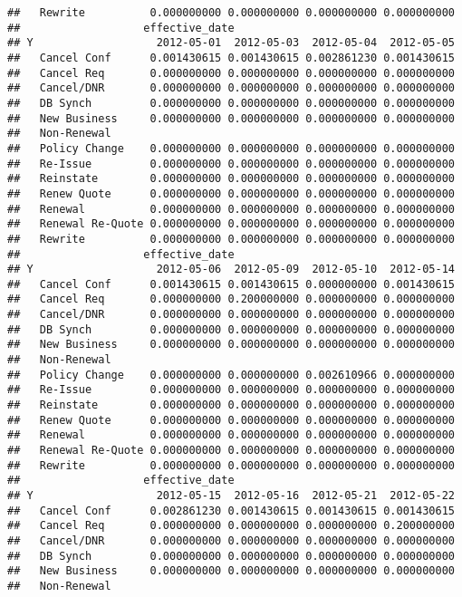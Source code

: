 \documentclass[]{article}
\begin{document}
\begin{verbatim}
##   Rewrite          0.000000000 0.000000000 0.000000000 0.000000000
##                   effective_date
## Y                   2012-05-01  2012-05-03  2012-05-04  2012-05-05
##   Cancel Conf      0.001430615 0.001430615 0.002861230 0.001430615
##   Cancel Req       0.000000000 0.000000000 0.000000000 0.000000000
##   Cancel/DNR       0.000000000 0.000000000 0.000000000 0.000000000
##   DB Synch         0.000000000 0.000000000 0.000000000 0.000000000
##   New Business     0.000000000 0.000000000 0.000000000 0.000000000
##   Non-Renewal                                                     
##   Policy Change    0.000000000 0.000000000 0.000000000 0.000000000
##   Re-Issue         0.000000000 0.000000000 0.000000000 0.000000000
##   Reinstate        0.000000000 0.000000000 0.000000000 0.000000000
##   Renew Quote      0.000000000 0.000000000 0.000000000 0.000000000
##   Renewal          0.000000000 0.000000000 0.000000000 0.000000000
##   Renewal Re-Quote 0.000000000 0.000000000 0.000000000 0.000000000
##   Rewrite          0.000000000 0.000000000 0.000000000 0.000000000
##                   effective_date
## Y                   2012-05-06  2012-05-09  2012-05-10  2012-05-14
##   Cancel Conf      0.001430615 0.001430615 0.000000000 0.001430615
##   Cancel Req       0.000000000 0.200000000 0.000000000 0.000000000
##   Cancel/DNR       0.000000000 0.000000000 0.000000000 0.000000000
##   DB Synch         0.000000000 0.000000000 0.000000000 0.000000000
##   New Business     0.000000000 0.000000000 0.000000000 0.000000000
##   Non-Renewal                                                     
##   Policy Change    0.000000000 0.000000000 0.002610966 0.000000000
##   Re-Issue         0.000000000 0.000000000 0.000000000 0.000000000
##   Reinstate        0.000000000 0.000000000 0.000000000 0.000000000
##   Renew Quote      0.000000000 0.000000000 0.000000000 0.000000000
##   Renewal          0.000000000 0.000000000 0.000000000 0.000000000
##   Renewal Re-Quote 0.000000000 0.000000000 0.000000000 0.000000000
##   Rewrite          0.000000000 0.000000000 0.000000000 0.000000000
##                   effective_date
## Y                   2012-05-15  2012-05-16  2012-05-21  2012-05-22
##   Cancel Conf      0.002861230 0.001430615 0.001430615 0.001430615
##   Cancel Req       0.000000000 0.000000000 0.000000000 0.200000000
##   Cancel/DNR       0.000000000 0.000000000 0.000000000 0.000000000
##   DB Synch         0.000000000 0.000000000 0.000000000 0.000000000
##   New Business     0.000000000 0.000000000 0.000000000 0.000000000
##   Non-Renewal                                                     

\end{verbatim}
\end{document}
